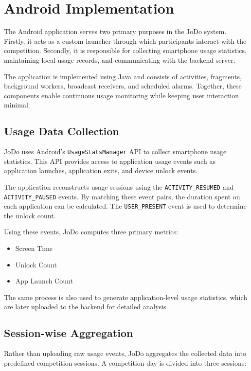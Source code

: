 \documentclass[11pt]{report}
\begin{document}
\section{Android Implementation}

The Android application serves two primary purposes in the JoDo system. 
Firstly, it acts as a custom launcher through which participants interact with the 
competition. Secondly, it is responsible for collecting smartphone usage statistics, 
maintaining local usage records, and communicating with the backend server.

The application is implemented using Java and consists of activities, fragments, 
background workers, broadcast receivers, and scheduled alarms. Together, 
these components enable continuous usage monitoring while keeping user 
interaction minimal.

\subsection{Usage Data Collection}

JoDo uses Android's \texttt{UsageStatsManager} API to collect smartphone usage statistics. 
This API provides access to application usage events such as application launches, 
application exits, and device unlock events.

The application reconstructs usage sessions using the \texttt{ACTIVITY\_RESUMED} 
and \texttt{ACTIVITY\_PAUSED} events. By matching these event pairs, the duration 
spent on each application can be calculated. The \texttt{USER\_PRESENT} event is 
used to determine the unlock count.

Using these events, JoDo computes three primary metrics:

\begin{itemize}
    \item Screen Time
    \item Unlock Count
    \item App Launch Count
\end{itemize}

The same process is also used to generate application-level usage statistics, 
which are later uploaded to the backend for detailed analysis.

\subsection{Session-wise Aggregation}

Rather than uploading raw usage events, JoDo aggregates the collected data into 
predefined competition sessions. A competition day is divided into three sessions:
\end{document}
